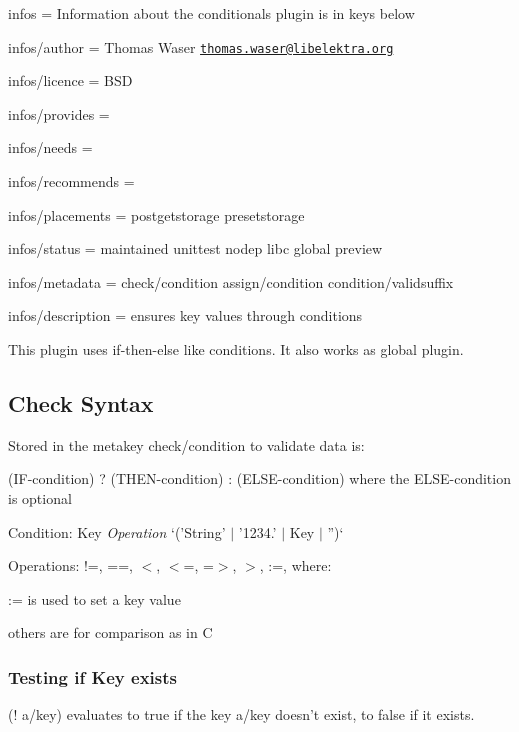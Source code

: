 
\begin{DoxyItemize}
\item infos = Information about the conditionals plugin is in keys below
\item infos/author = Thomas Waser \href{mailto:thomas.waser@libelektra.org}{\tt thomas.\+waser@libelektra.\+org}
\item infos/licence = B\+S\+D
\item infos/provides =
\item infos/needs =
\item infos/recommends =
\item infos/placements = postgetstorage presetstorage
\item infos/status = maintained unittest nodep libc global preview
\item infos/metadata = check/condition assign/condition condition/validsuffix
\item infos/description = ensures key values through conditions
\end{DoxyItemize}

This plugin uses if-\/then-\/else like conditions. It also works as global plugin.

\subsection*{Check Syntax}

Stored in the metakey {\ttfamily check/condition} to validate data is\+:

{\ttfamily (I\+F-\/condition) ? (T\+H\+E\+N-\/condition) \+: (E\+L\+S\+E-\/condition)} where the E\+L\+S\+E-\/condition is optional

Condition\+: {\ttfamily Key} {\itshape Operation} `('String' $\vert$ '1234.' $\vert$ Key $\vert$ '')`

Operations\+: {\ttfamily !=, ==, $<$, $<$=, =$>$, $>$, \+:=}, where\+:


\begin{DoxyItemize}
\item {\ttfamily \+:=} is used to set a key value
\item others are for comparison as in C
\end{DoxyItemize}

\subsubsection*{Testing if Key exists}

{\ttfamily (! a/key)} evaluates to true if the key {\ttfamily a/key} doesn't exist, to false if it exists.

